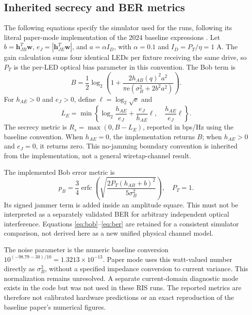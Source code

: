 \documentclass[journal,10pt,twocolumn]{IEEEtran}
\begin{document}
\subsection{Inherited secrecy and BER metrics}
The following equations specify the simulator used for the runs, following its literal paper-mode implementation of the 2024 baseline expressions \cite{liu2024smart}. Let $b=\mathbf h_{JB}^{T}\mathbf w$, $e_J=|\mathbf h_{JE}^{T}\mathbf w|$, and $a=\alpha I_D$, with $\alpha=0.1$ and $I_D=P_T/\eta=1$ A. The gain calculation sums four identical LEDs per fixture receiving the same drive, so $P_T$ is the per-LED optical bias parameter in this convention. The Bob term is
\begin{equation}
B=\frac12\log_2\!\left(1+
\frac{2h_{AB}(q)^2a^2}{\pi\mathrm e(\sigma_B^2+2b^2a^2)}\right).
\label{eq:bob}
\end{equation}
For $h_{AE}>0$ and $e_J>0$, define $\ell=\log_2\sqrt{\mathrm e}$ and
\begin{equation}
L_E=\min\!\left\{\log_2\frac{h_{AE}}{e_J}
+\frac{e_J}{h_{AE}}\ell,\quad\frac{h_{AE}}{e_J}\ell\right\}.
\label{eq:eve}
\end{equation}
The secrecy metric is $R_s=\max(0,B-L_E)$, reported in bps/Hz using the baseline convention. When $h_{AE}=0$, the implementation returns $B$; when $h_{AE}>0$ and $e_J=0$, it returns zero. This no-jamming boundary convention is inherited from the implementation, not a general wiretap-channel result.

The implemented Bob error metric is
\begin{equation}
p_B=\frac34\operatorname{erfc}\!\left(
\sqrt{\frac{2P_T(h_{AB}+b)^2}{5\sigma_B^2}}\right),\quad P_T=1.
\label{eq:ber}
\end{equation}
Its signed jammer term is added inside an amplitude square. This must not be interpreted as a separately validated BER for arbitrary independent optical interference. Equations \eqref{eq:bob}--\eqref{eq:ber} are retained for a consistent simulator comparison, not derived here as a new unified physical channel model.

The noise parameter is the numeric baseline conversion $10^{(-98.79-30)/10}=1.3213\times10^{-13}$. Paper mode uses this watt-valued number directly as $\sigma_B^2$, without a specified impedance conversion to current variance. This normalization remains unresolved. A separate current-domain diagnostic mode exists in the code but was not used in these RIS runs. The reported metrics are therefore not calibrated hardware predictions or an exact reproduction of the baseline paper's numerical figures.
\end{document}
